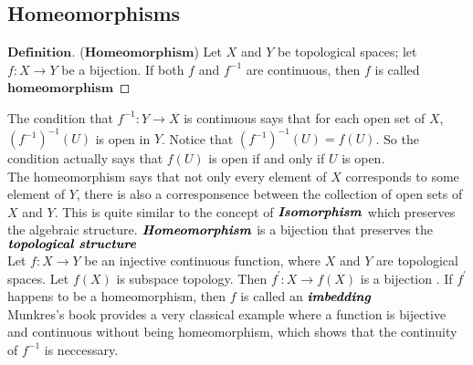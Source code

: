 \documentclass[a4paper, 11pt]{article}
\theoremstyle{definition}
\theoremstyle{remark}
\newenvironment{mydef}
{\renewcommand\qedsymbol{$ $}\begin{proof}[$\mathbf{Definition}$]}
  {\end{proof}}
\theoremstyle{definition}
\begin{document}
\subsection{Homeomorphisms}
\begin{mydef}($\textbf{Homeomorphism}$)
       Let $X$ and $Y$ be topological spaces; let $f:X\rightarrow Y$ be a 
       bijection. If both $f$ and $f^{-1}$ are continuous, then $f$ is called
       $\textbf{homeomorphism}$
\end{mydef}
The condition that $f^{-1}:Y\rightarrow X$ is continuous says that 
for each open set of $X$, $(f^{-1})^{-1}(U)$ is open in $Y$. Notice that 
$(f^{-1})^{-1}(U)=f(U)$. So the condition actually says that $f(U)$ is open
if and only if $U$ is open.\\
\indent The homeomorphism says that not only every element of $X$ corresponds to
some element of $Y$, there is also a corresponsence between the collection of 
open sets of $X$ and $Y$. This is quite similar to the concept of $\textbf{\textit
{Isomorphism}}$ which preserves the algebraic structure. $\textbf{\textit{Homeomorphism}}$
is a bijection that preserves the $\textbf{\textit{topological structure}}$\\
\indent Let $f:X\rightarrow Y$ be an injective continuous function, where
$X$ and $Y$ are topological spaces. Let $f(X)$ is subspace
topology. Then $f^{'}:X\rightarrow
f(X)$ is a bijection . If $f^{'}$ happens
to be a homeomorphism, then $f$ is called an $\textbf{\textit{imbedding}}$\\
\indent
Munkres's book provides a very classical example where a function is bijective
and continuous without being homeomorphism, which shows that the continuity
of $f^{-1}$ is neccessary. 
\end{document}
